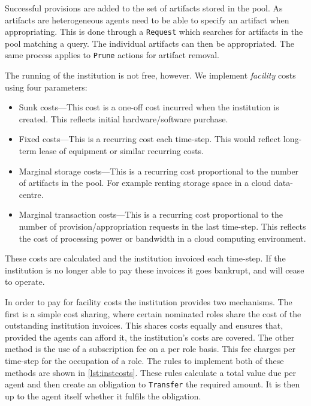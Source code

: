 Successful provisions are added to the set of artifacts stored in the pool. As
artifacts are heterogeneous agents need to be able to specify an artifact when
appropriating. This is done through a \texttt{Request} which searches for
artifacts in the pool matching a query. The individual artifacts can then be
appropriated. The same process applies to \texttt{Prune} actions for artifact
removal.

The running of the institution is not free, however. We implement
\emph{facility} costs using four parameters:

\begin{itemize}
\item Sunk costs---This cost is a one-off cost incurred when the institution is created. This reflects initial hardware/software purchase.
\item Fixed costs---This is a recurring cost each time-step. This would reflect long-term lease of equipment or similar recurring costs.
\item Marginal storage costs---This is a recurring cost proportional to the number of artifacts in the pool. For example renting storage space in a cloud data-centre.
\item Marginal transaction costs---This is a recurring cost proportional to the number of provision/appropriation requests in the last time-step. This reflects the cost of processing power or bandwidth in a cloud computing environment.
\end{itemize}

These costs are calculated and the institution invoiced each time-step. If the
institution is no longer able to pay these invoices it goes bankrupt, and will
cease to operate.


In order to pay for facility costs the institution provides two mechanisms.
The first is a simple cost sharing, where certain nominated roles share the
cost of the outstanding institution invoices. This shares costs equally and
ensures that, provided the agents can afford it, the institution's costs are
covered. The other method is the use of a subscription fee on a per role
basis. This fee charges per time-step for the occupation of a role. The rules
to implement both of these methods are shown in \autoref{lst:instcosts}. These
rules calculate a total value due per agent and then create an obligation to
\texttt{Transfer} the required amount. It is then up to the agent itself whether
it fulfils the obligation.

